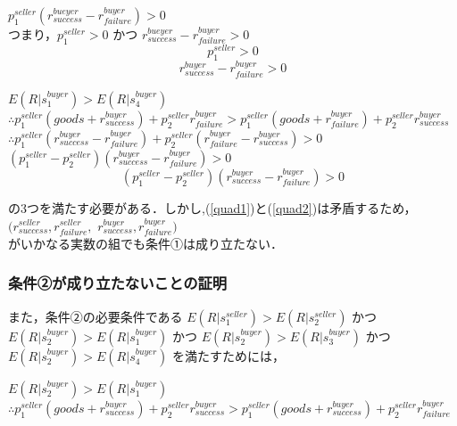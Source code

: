 \documentclass[twocolumn, a4j]{article}
\begin{document}
$ p^{seller}_1 (r^{bueyer}_{success} - r^{buyer}_{failure}) > 0$\\

つまり，$ p^{seller}_1 > 0$ かつ $r^{bueyer}_{success} - r^{buyer}_{failure} > 0$\\

\begin{equation}
   p^{seller}_1 > 0
\end{equation}
\begin{equation}
   \label{quad2}
   r^{buyer}_{success} - r^{buyer}_{failure} > 0
\end{equation}

$ E(R|s^{buyer}_1) > E(R|s^{buyer}_4)$ \\

$\therefore p^{seller}_1 (goods + r^{buyer}_{success}) + p^{seller}_2 r^{buyer}_{failure} > p^{seller}_1 (goods + r^{buyer}_{failure}) + p^{seller}_2 r^{buyer}_{success}$ \\

$\therefore p^{seller}_1(r^{buyer}_{success} - r^{buyer}_{failure}) + p^{seller}_2(r^{buyer}_{failure} - r^{buyer}_{success}) > 0$ \\

$ (p^{seller}_1 - p^{seller}_2)(r^{buyer}_{success} - r^{buyer}_{failure}) > 0$\\

\begin{equation}
\label{quad3}
  (p^{seller}_1 - p^{seller}_2)(r^{buyer}_{success} - r^{buyer}_{failure}) > 0
\end{equation}

の3つを満たす必要がある．しかし,(\ref{quad1})と(\ref{quad2})は矛盾するため，
$(r^{seller}_{success}, r^{seller}_{failure}, $
$r^{buyer}_{success}, r^{buyer}_{failure})$ \\
がいかなる実数の組でも条件①は成り立たない． \\


\subsubsection{条件②が成り立たないことの証明}
また，条件②の必要条件である
$E(R|s^{seller}_1)>E(R|s^{seller}_2)$
かつ
$E(R|s^{buyer}_2)>E(R|s^{buyer}_1)$
かつ
$E(R|s^{buyer}_2) > E(R|s^{buyer}_3)$
かつ
$E(R|s^{buyer}_2) > E(R|s^{buyer}_4)$
を満たすためには，

$ E(R|s^{buyer}_2) > E(R|s^{buyer}_1)$ \\

$\therefore p^{seller}_1 (goods + r^{buyer}_{success}) + p^{seller}_2 r^{buyer}_{success} > p^{seller}_1 (goods + r^{buyer}_{success}) + p^{seller}_2 r^{buyer}_{failure}$\\
\end{document}
